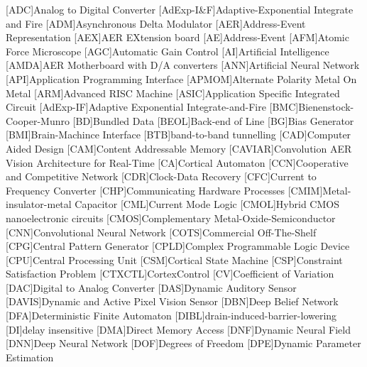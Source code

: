 [ADC]{Analog to Digital Converter}
[AdExp-I\&F]{Adaptive-Exponential Integrate and Fire}
[ADM]{Asynchronous Delta Modulator}
[AER]{Address-Event Representation}
[AEX]{AER EXtension board}
[AE]{Address-Event}
[AFM]{Atomic Force Microscope}
[AGC]{Automatic Gain Control}
[AI]{Artificial Intelligence}
[AMDA]{AER Motherboard with D/A converters}
[ANN]{Artificial Neural Network}
[API]{Application Programming Interface}
[APMOM]{Alternate Polarity Metal On Metal}
[ARM]{Advanced RISC Machine}
[ASIC]{Application Specific Integrated Circuit}
[AdExp-IF]{Adaptive Exponential Integrate-and-Fire}
[BMC]{Bienenstock-Cooper-Munro}
[BD]{Bundled Data}
[BEOL]{Back-end of Line}
[BG]{Bias Generator}
[BMI]{Brain-Machince Interface}
[BTB]{band-to-band tunnelling}
[CAD]{Computer Aided Design}
[CAM]{Content Addressable Memory}
[CAVIAR]{Convolution AER Vision Architecture for Real-Time}
[CA]{Cortical Automaton}
[CCN]{Cooperative and Competitive Network}
[CDR]{Clock-Data Recovery}
[CFC]{Current to Frequency Converter}
[CHP]{Communicating Hardware Processes}
[CMIM]{Metal-insulator-metal Capacitor}
[CML]{Current Mode Logic}
[CMOL]{Hybrid CMOS nanoelectronic circuits}
[CMOS]{Complementary Metal-Oxide-Semiconductor}
[CNN]{Convolutional Neural Network}
[COTS]{Commercial Off-The-Shelf}
[CPG]{Central Pattern Generator}
[CPLD]{Complex Programmable Logic Device}
[CPU]{Central Processing Unit}
[CSM]{Cortical State Machine}
[CSP]{Constraint Satisfaction Problem}
[CTXCTL]{CortexControl}
[CV]{Coefficient of Variation}
[DAC]{Digital to Analog Converter}
[DAS]{Dynamic Auditory Sensor}
[DAVIS]{Dynamic and Active Pixel Vision Sensor}
[DBN]{Deep Belief Network}
[DFA]{Deterministic Finite Automaton}
[DIBL]{drain-induced-barrier-lowering}
[DI]{delay insensitive}
[DMA]{Direct Memory Access}
[DNF]{Dynamic Neural Field}
[DNN]{Deep Neural Network}
[DOF]{Degrees of Freedom}
[DPE]{Dynamic Parameter Estimation}
